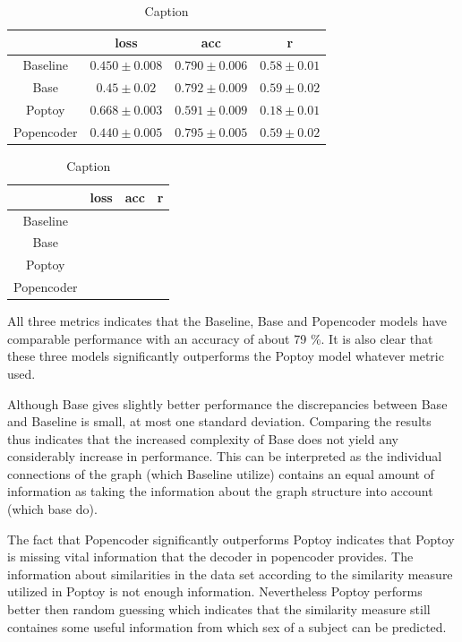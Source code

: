 \begin{table}[H]
    \centering
    \caption{Caption}
    \begin{tabular}{c|c|c|c}
         &  loss & acc & r\\ \hline
        Baseline & $0.450\pm0.008$ & $0.790\pm0.006$ &$0.58\pm 0.01$\\
        Base &$0.45\pm0.02$ & $0.792\pm0.009$& $0.59\pm0.02$\\
        Poptoy &$0.668\pm 0.003$ & $0.591\pm0.009$ &$0.18\pm0.01$\\
        Popencoder &$0.440\pm0.005$& $0.795\pm 0.005$ & $0.59\pm0.02$\\
    \end{tabular}
    \label{tab:sex_model_results}
\end{table}



\begin{table}[H]
    \centering
    \caption{Caption}
    \begin{tabular}{c|c|c|c}
         &  loss & acc & r\\ \hline
        Baseline &  &  &\\
        Base & & & \\
        Poptoy & & &\\
        Popencoder & & & \\
    \end{tabular}
    \label{tab:sex_model_results}
\end{table}
All three metrics indicates that the Baseline, Base and Popencoder models have comparable performance with an accuracy of about 79 \%. It is also clear that these three models significantly outperforms the Poptoy model whatever metric used.

Although Base gives slightly better performance the discrepancies between Base and Baseline is small, at most one standard deviation. Comparing the results thus indicates that the increased complexity of Base does not yield any considerably increase in performance. This can be interpreted as the individual connections of the graph (which Baseline utilize) contains an equal amount of information as taking the information about the graph structure into account (which base do). 

The fact that Popencoder significantly outperforms Poptoy indicates that Poptoy is missing vital information that the decoder in popencoder provides. The information about similarities in the data set according to the similarity measure utilized in Poptoy is not enough information. Nevertheless Poptoy performs better then random guessing which indicates that the similarity measure still containes some useful information from which sex 
of a subject can be predicted. 

